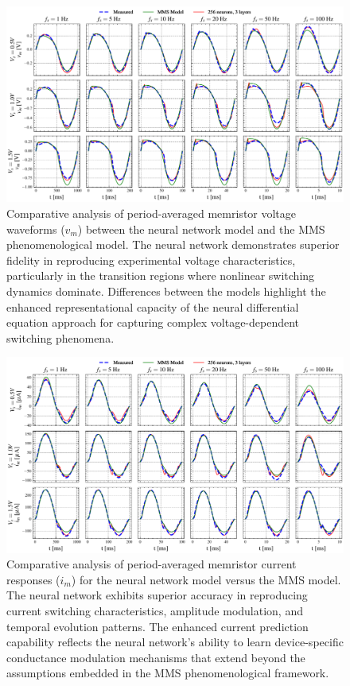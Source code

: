 \documentclass[11pt, oneside]{article}
\begin{document}
\begin{figure}[htbp!]
    \centering
    \includegraphics[width=\linewidth]{mms_results/simulated_vms.pdf}
    \caption{Comparative analysis of period-averaged memristor voltage waveforms ($v_m$) between the neural network model and the MMS phenomenological model. The neural network demonstrates superior fidelity in reproducing experimental voltage characteristics, particularly in the transition regions where nonlinear switching dynamics dominate. Differences between the models highlight the enhanced representational capacity of the neural differential equation approach for capturing complex voltage-dependent switching phenomena.}
    \label{fig:mms_vms}
\end{figure}

\begin{figure}[htbp!]
    \centering
    \includegraphics[width=\linewidth]{mms_results/simulated_ims.pdf}
    \caption{Comparative analysis of period-averaged memristor current responses ($i_m$) for the neural network model versus the MMS model. The neural network exhibits superior accuracy in reproducing current switching characteristics, amplitude modulation, and temporal evolution patterns. The enhanced current prediction capability reflects the neural network's ability to learn device-specific conductance modulation mechanisms that extend beyond the assumptions embedded in the MMS phenomenological framework.}
    \label{fig:mms_ims}
\end{figure}
\end{document}
